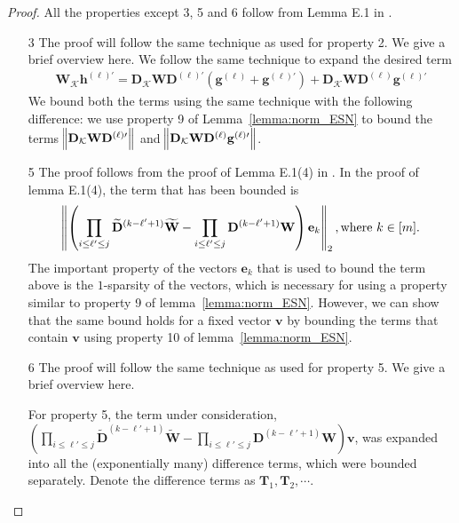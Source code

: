 \begin{proof}
	All the properties except 3, 5 and 6 follow from Lemma E.1 in \cite{allen2019can}. 
	\begin{enumerate}
		\item[3] The proof will follow the same technique as used for property 2. We give a brief overview here. We follow the same technique to expand the desired term
		\begin{align*}
			\mathbf{W}_{\mathcal{K}} \mathbf{h}^{(\ell)\prime} = \mathbf{D}_{\mathcal{K}} \mathbf{W} \mathbf{D}^{(\ell)\prime} (\mathbf{g}^{(\ell)} + \mathbf{g}^{(\ell)\prime}) + \mathbf{D}_{\mathcal{K}} \mathbf{W} \mathbf{D}^{(\ell)}  \mathbf{g}^{(\ell)\prime}
		\end{align*}
		We bound both the terms using the same technique with the following difference: 
		we use property 9 of Lemma~\ref{lemma:norm_ESN} to bound the terms $\norm{\mathbf{D}_{\mathcal{K}} \mathbf{W} \mathbf{D}^{(\ell)\prime}}$ and $\norm{\mathbf{D}_{\mathcal{K}} \mathbf{W} \mathbf{D}^{(\ell)}  \mathbf{g}^{(\ell)\prime}}$.
		
		\item[5] The proof follows from the proof of Lemma E.1(4) in \cite{allen2019can}. In the proof of lemma E.1(4), the term that has been bounded is
		\begin{align*}
			\norm{ \left(\prod_{i \le \ell' \le j} \widetilde{\mathbf{D}}^{(k - \ell' + 1)} \widetilde{\mathbf{W}}  - \prod_{i \le \ell' \le j} \mathbf{D}^{(k - \ell' + 1)} \mathbf{W} \right) \mathbf{e}_k}_{2}, \text{where } k \in [m].
		\end{align*}
		The important property of the vectors $\mathbf{e}_k$ that is used to bound the term above is the $1$-sparsity of the vectors, which is necessary for using a property similar to property 9 of lemma~\ref{lemma:norm_ESN}.
		However, we can show that the same bound holds for a fixed vector $\mathbf{v}$ by bounding the terms that contain $\mathbf{v}$ using property 10 of lemma~\ref{lemma:norm_ESN}.
		
		
		\item[6] The proof will follow the same technique as used for property 5. We give a brief overview here. 
		
		For property 5, the term under consideration, $\left(\prod_{i \le \ell' \le j} \widetilde{\mathbf{D}}^{(k - \ell' + 1)} \widetilde{\mathbf{W}}  - \prod_{i \le \ell' \le j} \mathbf{D}^{(k - \ell' + 1)} \mathbf{W} \right) \mathbf{v}$, was expanded into all the (exponentially many) difference
		terms, which were bounded separately. Denote the difference terms as $\mathbf{T}_1, \mathbf{T}_2, \cdots$. 
		

\end{enumerate}
\end{proof}
